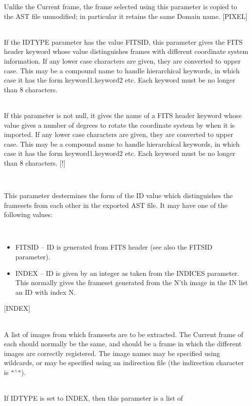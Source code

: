 \documentclass[twoside,11pt]{article}
\renewcommand{\_}{\texttt{\symbol{95}}}
\newcommand{\qt}[1]{{\tt "}#1{\tt "}}
\newcommand{\sstsubsection}[1]{ \item[{#1}] \mbox{} \\}
\newcommand{\sstitemlist}[1]{
  \mbox{} \\
  \vspace{-3.5ex}
  \begin{itemize}
     #1
  \end{itemize}
}
\newcommand{\sstitem}{\item}
\newcommand{\sstsubsection}[1]{\item[{#1}]}
\newcommand{\sstitemlist}[1]{
      \begin{itemize}
         #1
      \end{itemize}
      \\
   }
\newcommand{\sstitem}{\item}
\begin{document}
{{{         Unlike the Current frame, the frame selected using this
         parameter is copied to the AST file unmodified; in particular
         it retains the same Domain name.
         [PIXEL]
      }
      \sstsubsection{
         FITSID = LITERAL (Read)
      }{
         If the IDTYPE parameter has the value FITSID, this parameter
         gives the FITS header keyword whose value distinguishes
         frames with different coordinate system information.
         If any lower case characters are given, they are converted
         to upper case.  This may be a compound name to handle
         hierarchical keywords, in which case it has the form
         keyword1.keyword2 etc.  Each keyword must be no longer than
         8 characters.
      }
      \sstsubsection{
         FITSROT = LITERAL (Read)
      }{
         If this parameter is not null, it gives the name of a FITS
         header keyword whose value gives a number of degrees to
         rotate the coordinate system by when it is imported.
         If any lower case characters are given, they are converted
         to upper case.  This may be a compound name to handle
         hierarchical keywords, in which case it has the form
         keyword1.keyword2 etc.  Each keyword must be no longer than
         8 characters.
         [!]
      }
      \sstsubsection{
         IDTYPE = LITERAL (Read)
      } {
         This parameter destermines the form of the ID value which
         distinguishes the framesets from each other in the exported
         AST file.  It may have one of the following values:
         \sstitemlist{
            \sstitem
              FITSID  -- ID is generated from FITS header (see also
                    the FITSID parameter).
            \sstitem
              INDEX   -- ID is given by an integer as taken from the
                    INDICES parameter.  This normally gives the
                    frameset generated from the N'th image in the
                    IN list an ID with index N.
         }
         [INDEX]
      }
      \sstsubsection{
          IN = LITERAL (Read)
      } {
          A list of images from which framesets are to be extracted.
          The Current frame of each should normally be the same, and
          should be a frame in which the different images are correctly
          registered.  The image names may be specified using wildcards,
          or may be specified using an indirection file (the indirection
          character is \qt{$^\wedge$}).
      }
      \sstsubsection{
          INDICES( ) = \_INTEGER (Read)
      } {
          If IDTYPE is set to INDEX, then this parameter is a list of
}}}
\end{document}
